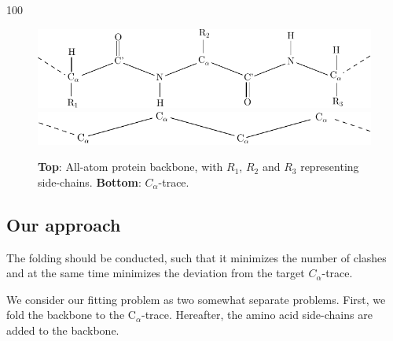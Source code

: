 \documentclass[a0,portrait]{a0poster}
\newcommand{\Ca}{C$_{\alpha}${}}
\begin{document}
\begin{GridBlock}{0}{21}{100}
\begin{multicols}{3}
\begin{figure}
  \centering
  \vspace{1cm}
  \includegraphics[width=0.65\columnwidth]{exampleposter-figures/amino_connect}  
  \\[1cm]
  \includegraphics[width=0.65\columnwidth]{exampleposter-figures/Calpha_backbone}
  \caption{\textbf{Top}: All-atom protein backbone, with $R_1$, $R_2$ 
    and $R_3$ representing side-chains. \textbf{Bottom}: $C_{\alpha}$-trace. }
  \label{fig:all-atom_vs_trace}
\end{figure}

\subsection{Our approach}
The folding should be conducted, such that it minimizes the number of
clashes and at the same time minimizes the deviation from the target
$C_\alpha$-trace.

We consider our fitting problem as two somewhat separate problems.
First, we fold the backbone to the \Ca-trace.
Hereafter, the amino acid side-chains are added to the backbone.
\end{multicols}
\end{GridBlock}
\end{document}
